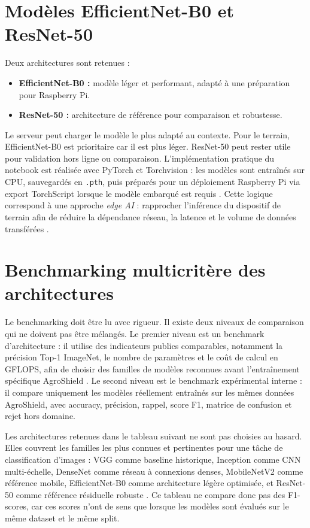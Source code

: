 ﻿\documentclass[11pt,a4paper,openany]{report}
\begin{document}
\section{Modèles EfficientNet-B0 et ResNet-50}
Deux architectures sont retenues :
\begin{itemize}
  \item \textbf{EfficientNet-B0 :} modèle léger et performant, adapté à une préparation pour Raspberry Pi.
  \item \textbf{ResNet-50 :} architecture de référence pour comparaison et robustesse.
\end{itemize}

Le serveur peut charger le modèle le plus adapté au contexte. Pour le terrain, EfficientNet-B0 est prioritaire car il est plus léger. ResNet-50 peut rester utile pour validation hors ligne ou comparaison. L'implémentation pratique du notebook est réalisée avec PyTorch et Torchvision : les modèles sont entraînés sur CPU, sauvegardés en \texttt{.pth}, puis préparés pour un déploiement Raspberry Pi via export TorchScript lorsque le modèle embarqué est requis \cite{pytorch,torchvision}. Cette logique correspond à une approche \textit{edge AI} : rapprocher l'inférence du dispositif de terrain afin de réduire la dépendance réseau, la latence et le volume de données transférées \cite{banerjeetinyml}.

\section{Benchmarking multicritère des architectures}
Le benchmarking doit être lu avec rigueur. Il existe deux niveaux de comparaison qui ne doivent pas être mélangés. Le premier niveau est un benchmark d'architecture : il utilise des indicateurs publics comparables, notamment la précision Top-1 ImageNet, le nombre de paramètres et le coût de calcul en GFLOPS, afin de choisir des familles de modèles reconnues avant l'entraînement spécifique AgroShield \cite{torchvisionmodels}. Le second niveau est le benchmark expérimental interne : il compare uniquement les modèles réellement entraînés sur les mêmes données AgroShield, avec accuracy, précision, rappel, score F1, matrice de confusion et rejet hors domaine.

Les architectures retenues dans le tableau suivant ne sont pas choisies au hasard. Elles couvrent les familles les plus connues et pertinentes pour une tâche de classification d'images : VGG comme baseline historique, Inception comme CNN multi-échelle, DenseNet comme réseau à connexions denses, MobileNetV2 comme référence mobile, EfficientNet-B0 comme architecture légère optimisée, et ResNet-50 comme référence résiduelle robuste \cite{vgg,inceptionv3,densenet,mobilenetv2,efficientnet,resnet}. Ce tableau ne compare donc pas des F1-scores, car ces scores n'ont de sens que lorsque les modèles sont évalués sur le même dataset et le même split.
\end{document}
